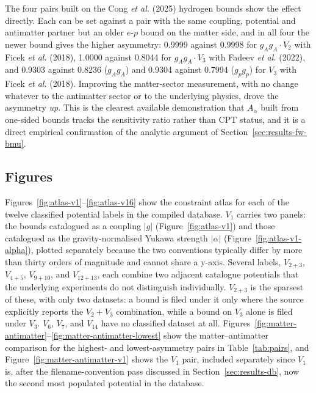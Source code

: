 The four pairs built on the Cong \textit{et al.} (2025) hydrogen bounds
show the effect directly. Each can be set against a pair with the same
coupling, potential and antimatter partner but an older $e$-$p$ bound on
the matter side, and in all four the newer bound gives the higher
asymmetry: 0.9999 against 0.9998 for $g_Ag_A\cdot V_2$ with Ficek
\textit{et al.} (2018), 1.0000 against 0.8044 for $g_Ag_A\cdot V_3$ with
Fadeev \textit{et al.} (2022), and 0.9303 against 0.8236 ($g_Ag_A$) and
0.9304 against 0.7994 ($g_pg_p$) for $V_3$ with Ficek \textit{et al.}
(2018). Improving the matter-sector measurement, with no change whatever
to the antimatter sector or to the underlying physics, drove the asymmetry
\emph{up}. This is the clearest available demonstration
that $A_\alpha$ built from one-sided bounds tracks the sensitivity ratio
rather than CPT status, and it is a direct empirical confirmation of the
analytic argument of Section~\ref{sec:results-fw-bmu}.

\subsection{Figures}

Figures~\ref{fig:atlas-v1}--\ref{fig:atlas-v16} show the constraint atlas
for each of the twelve classified potential labels in the compiled
database. $V_1$ carries two panels: the bounds catalogued as a coupling
$|g|$ (Figure~\ref{fig:atlas-v1}) and those catalogued as the
gravity-normalised Yukawa strength $|\alpha|$
(Figure~\ref{fig:atlas-v1-alpha}), plotted separately because the two
conventions typically differ by more than thirty orders of magnitude and cannot share a y-axis. Several labels, $V_{2+3}$, $V_{4+5}$, $V_{9+10}$, and
$V_{12+13}$, each combine two adjacent catalogue potentials that the
underlying experiments do not distinguish individually. $V_{2+3}$ is the
sparsest of these, with only two datasets: a bound is filed under it only
where the source explicitly reports the $V_2+V_3$ combination, while a
bound on $V_3$ alone is filed under $V_3$. $V_6$, $V_7$, and $V_{14}$ have
no classified dataset at all. Figures~\ref{fig:matter-antimatter}--\ref{fig:matter-antimatter-lowest}
show the matter--antimatter comparison for the highest- and
lowest-asymmetry pairs in Table~\ref{tab:pairs}, and
Figure~\ref{fig:matter-antimatter-v1} shows the $V_1$ pair, included
separately since $V_1$ is, after the filename-convention pass discussed in
Section~\ref{sec:results-db}, now the second most populated potential in
the database.

